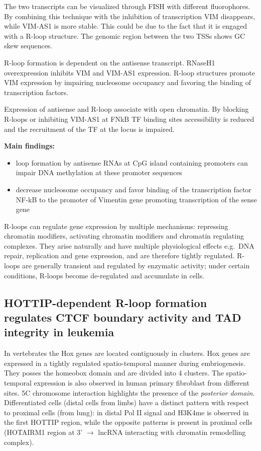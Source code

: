 The two transcripts can be visualized through FISH with different fluorophores. By combining this technique with the inhibition of transcription VIM disappears, while VIM-AS1 is more stable. This could be due to the fact that it is engaged with a R-loop structure. The genomic region between the two TSSs shows GC skew sequences.

R-loop formation is dependent on the antisense transcript. RNaseH1 overexpression inhibits VIM and VIM-AS1 expression. R-loop structures promote VIM expression by impairing nucleosome occupancy and favoring the binding of transcription factors.

Expression of antisense and R-loop associate with open chromatin. By blocking R-loops or inhibiting VIM-AS1 at FNkB TF binding sites accessibility is reduced and the recruitment of the TF at the locus is impaired.

\textbf{Main findings:}
\begin{itemize}
\tightlist
\item
  loop formation by antisense RNAs at CpG island containing promoters can impair DNA methylation at these promoter sequences
\item
  decrease nucleosome occupancy and favor binding of the transcription factor NF-kB to the promoter of Vimentin gene promoting transcription of the sense gene
\end{itemize}

R-loops can regulate gene expression by multiple mechanisms: repressing chromatin modifiers, activating chromatin modifiers and chromatin regulating complexes. They arise naturally and have multiple physiological effects e.g.~DNA repair, replication and gene expression, and are therefore tightly regulated. R-loops are generally transient and regulated by enzymatic activity; under certain conditions, R-loops become de-regulated and accumulate in cells.

\hypertarget{hottip-dependent-r-loop-formation-regulates-ctcf-boundary-activity-and-tad-integrity-in-leukemia}{%
\subsection{HOTTIP-dependent R-loop formation regulates CTCF boundary activity and TAD integrity in leukemia}\label{hottip-dependent-r-loop-formation-regulates-ctcf-boundary-activity-and-tad-integrity-in-leukemia}}

In vertebrates the Hox genes are located contiguously in clusters. Hox genes are expressed in a tightly regulated spatio-temporal manner during embriogenesis. They posses the homeobox domain and are divided into 4 clusters. The spatio-temporal expression is also observed in human primary fibroblast from different sites. 5C chromosome interaction highlights the presence of the \emph{posterior domain}. Differentiated cells (distal cells from limbs) have a distinct pattern with respect to proximal cells (from lung): in distal Pol II signal and H3K4me is observed in the first HOTTIP region, while the opposite patterns is present in proximal cells (HOTAIRM1 region at 3' $\rightarrow$ lncRNA interacting with chromatin remodelling complex).

